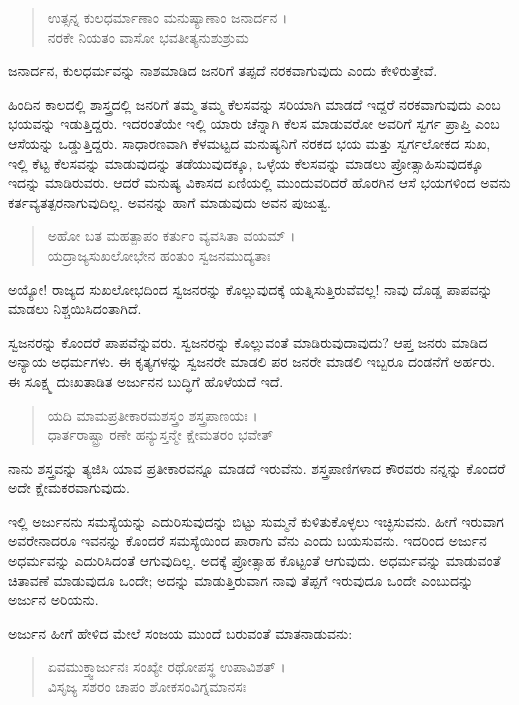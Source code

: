 \begin{verse}
ಉತ್ಸನ್ನ ಕುಲಧರ್ಮಾಣಾಂ ಮನುಷ್ಯಾಣಾಂ ಜನಾರ್ದನ ।\\ನರಕೇ ನಿಯತಂ ವಾಸೋ ಭವತೀತ್ಯನುಶುಶ್ರುಮ 
\end{verse}

{\small ಜನಾರ್ದನ, ಕುಲಧರ್ಮವನ್ನು ನಾಶಮಾಡಿದ ಜನರಿಗೆ ತಪ್ಪದೆ ನರಕವಾಗುವುದು ಎಂದು ಕೇಳಿರುತ್ತೇವೆ.}

ಹಿಂದಿನ ಕಾಲದಲ್ಲಿ ಶಾಸ್ತ್ರದಲ್ಲಿ ಜನರಿಗೆ ತಮ್ಮ ತಮ್ಮ ಕೆಲಸವನ್ನು ಸರಿಯಾಗಿ ಮಾಡದೆ ಇದ್ದರೆ ನರಕವಾಗುವುದು ಎಂಬ ಭಯವನ್ನು ಇಡುತ್ತಿದ್ದರು. ಇದರಂತೆಯೇ ಇಲ್ಲಿ ಯಾರು ಚೆನ್ನಾಗಿ ಕೆಲಸ ಮಾಡುವರೋ ಅವರಿಗೆ ಸ್ವರ್ಗ ಪ್ರಾಪ್ತಿ ಎಂಬ ಆಸೆಯನ್ನು ಒಡ್ಡುತ್ತಿದ್ದರು. ಸಾಧಾರಣವಾಗಿ ಕೆಳಮಟ್ಟದ ಮನುಷ್ಯನಿಗೆ ನರಕದ ಭಯ ಮತ್ತು ಸ್ವರ್ಗಲೋಕದ ಸುಖ, ಇಲ್ಲಿ ಕೆಟ್ಟ ಕೆಲಸವನ್ನು ಮಾಡುವುದನ್ನು ತಡೆಯುವುದಕ್ಕೂ, ಒಳ್ಳೆಯ ಕೆಲಸವನ್ನು ಮಾಡಲು ಪ್ರೋತ್ಸಾಹಿಸುವುದಕ್ಕೂ ಇದನ್ನು ಮಾಡಿರುವರು. ಆದರೆ ಮನುಷ್ಯ ವಿಕಾಸದ ಏಣಿಯಲ್ಲಿ ಮುಂದುವರಿದರೆ ಹೊರಗಿನ ಆಸೆ ಭಯಗಳಿಂದ ಅವನು ಕರ್ತವ್ಯತತ್ಪರನಾಗುವುದಿಲ್ಲ. ಅವನನ್ನು ಹಾಗೆ ಮಾಡುವುದು ಅವನ ಪುಜುತ್ವ.

\begin{verse}
ಅಹೋ ಬತ ಮಹತ್ಪಾಪಂ ಕರ್ತುಂ ವ್ಯವಸಿತಾ ವಯಮ್ ।\\ಯದ್ರಾಜ್ಯಸುಖಲೋಭೇನ ಹಂತುಂ ಸ್ವಜನಮುದ್ಯತಾಃ 
\end{verse}

{\small ಅಯ್ಯೋ! ರಾಜ್ಯದ ಸುಖಲೋಭದಿಂದ ಸ್ವಜನರನ್ನು ಕೊಲ್ಲುವುದಕ್ಕೆ ಯತ್ನಿಸುತ್ತಿರುವೆವಲ್ಲ! ನಾವು ದೊಡ್ಡ ಪಾಪವನ್ನು ಮಾಡಲು ನಿಶ್ಚಯಿಸಿದಂತಾಗಿದೆ.}

ಸ್ವಜನರನ್ನು ಕೊಂದರೆ ಪಾಪವೆನ್ನುವರು. ಸ್ವಜನರನ್ನು ಕೊಲ್ಲುವಂತೆ ಮಾಡಿರುವುದಾವುದು? ಆಪ್ತ ಜನರು ಮಾಡಿದ ಅನ್ಯಾಯ ಅಧರ್ಮಗಳು. ಈ ಕೃತ್ಯಗಳನ್ನು ಸ್ವಜನರೇ ಮಾಡಲಿ ಪರ ಜನರೇ ಮಾಡಲಿ ಇಬ್ಬರೂ ದಂಡನೆಗೆ ಅರ್ಹರು. ಈ ಸೂಕ್ಷ್ಮ ದುಃಖತಾಡಿತ ಅರ್ಜುನನ ಬುದ್ಧಿಗೆ ಹೊಳೆಯದೆ ಇದೆ.

\begin{verse}
ಯದಿ ಮಾಮಪ್ರತೀಕಾರಮಶಸ್ತ್ರಂ ಶಸ್ತ್ರಪಾಣಯಃ ।\\ಧಾರ್ತರಾಷ್ಟ್ರಾ ರಣೇ ಹನ್ಯುಸ್ತನ್ಮೇ ಕ್ಷೇಮತರಂ ಭವೇತ್ 
\end{verse}

{\small ನಾನು ಶಸ್ತ್ರವನ್ನು ತ್ಯಜಿಸಿ ಯಾವ ಪ್ರತೀಕಾರವನ್ನೂ ಮಾಡದೆ ಇರುವೆನು. ಶಸ್ತ್ರಪಾಣಿಗಳಾದ ಕೌರವರು ನನ್ನನ್ನು ಕೊಂದರೆ ಅದೇ ಕ್ಷೇಮಕರವಾಗುವುದು.}

ಇಲ್ಲಿ ಅರ್ಜುನನು ಸಮಸ್ಯೆಯನ್ನು ಎದುರಿಸುವುದನ್ನು ಬಿಟ್ಟು ಸುಮ್ಮನೆ ಕುಳಿತುಕೊಳ್ಳಲು ಇಚ್ಛಿಸುವನು. ಹೀಗೆ ಇರುವಾಗ ಅವರೇನಾದರೂ ಇವನನ್ನು ಕೊಂದರೆ ಸಮಸ್ಯೆಯಿಂದ ಪಾರಾಗು ವೆನು ಎಂದು ಬಯಸುವನು. ಇದರಿಂದ ಅರ್ಜುನ ಅಧರ್ಮವನ್ನು ಎದುರಿಸಿದಂತೆ ಆಗುವುದಿಲ್ಲ. ಅದಕ್ಕೆ ಪ್ರೋತ್ಸಾಹ ಕೊಟ್ಟಂತೆ ಆಗುವುದು. ಅಧರ್ಮವನ್ನು ಮಾಡುವಂತೆ ಚಿತಾವಣೆ ಮಾಡುವುದೂ ಒಂದೇ; ಅದನ್ನು ಮಾಡುತ್ತಿರುವಾಗ ನಾವು ತೆಪ್ಪಗೆ ಇರುವುದೂ ಒಂದೇ ಎಂಬುದನ್ನು ಅರ್ಜುನ ಅರಿಯನು.

ಅರ್ಜುನ ಹೀಗೆ ಹೇಳಿದ ಮೇಲೆ ಸಂಜಯ ಮುಂದೆ ಬರುವಂತೆ ಮಾತನಾಡುವನು:

\begin{verse}
ಏವಮುಕ್ತ್ವಾರ್ಜುನಃ ಸಂಖ್ಯೇ ರಥೋಪಸ್ಥ ಉಪಾವಿಶತ್ ।\\ವಿಸೃಜ್ಯ ಸಶರಂ ಚಾಪಂ ಶೋಕಸಂವಿಗ್ನಮಾನಸಃ 
\end{verse}

